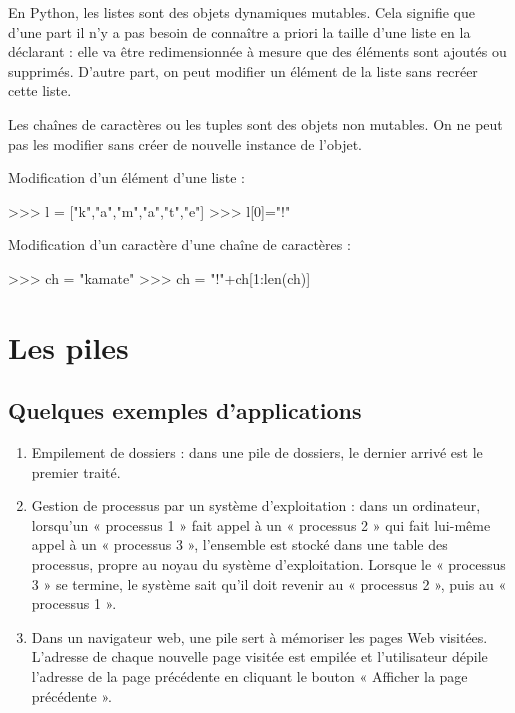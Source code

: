 \documentclass[10pt,fleqn]{article} %
\begin{document}
En Python, les listes sont des objets dynamiques mutables. Cela signifie que d'une part il n'y a pas besoin de connaître a priori la taille d'une liste en la déclarant : elle va être redimensionnée à mesure que des éléments sont ajoutés ou supprimés. D'autre part, on peut modifier un élément de la liste sans recréer cette liste. 
\begin{exemple}
Les chaînes de caractères ou les tuples sont des objets non mutables. On ne peut pas les modifier sans créer de nouvelle instance de l'objet.

Modification d'un élément d'une liste :
\begin{python}
>>> l = ["k","a","m","a","t","e"]
>>> l[0]="!"
\end{python}

Modification d'un caractère d'une chaîne de caractères :
\begin{python}
>>> ch = "kamate"
>>> ch = "!"+ch[1:len(ch)]
\end{python}

\end{exemple}

\section{Les piles}
\subsection{Quelques exemples d'applications}

\begin{enumerate}
\item Empilement de dossiers : dans une pile de dossiers, le dernier arrivé est le premier traité.

\item Gestion de processus par un système d’exploitation : dans un ordinateur, lorsqu’un « processus 1 » fait appel à un « processus 2 » qui fait lui-même appel à un « processus 3 », l’ensemble est stocké dans une table des processus, propre au noyau du système d’exploitation. Lorsque le « processus 3 » se termine, le système sait qu’il doit revenir au « processus 2 », puis au « processus 1 ». 
\item Dans un navigateur web, une pile sert à mémoriser les pages Web visitées. L'adresse de chaque nouvelle page visitée est empilée et l'utilisateur dépile l'adresse de la page précédente en cliquant le bouton « Afficher la page précédente ».
\end{enumerate}
\end{document}

